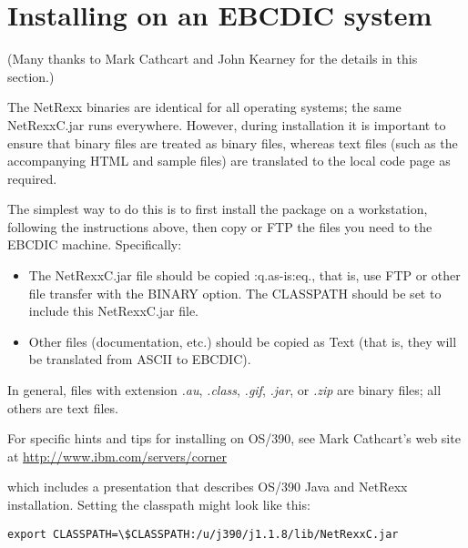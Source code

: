 \chapter{Installing on an EBCDIC system}

(Many thanks to Mark Cathcart and John Kearney for the details in this
section.)

The NetRexx binaries are identical for all operating systems; the same
NetRexxC.jar runs everywhere.
However, during installation it is important to ensure that binary files
are treated as binary files, whereas text files (such as the
accompanying HTML and sample files) are translated to the local code
page as required.

The simplest way to do this is to first install the package on a
workstation, following the instructions above, then copy or FTP the
files you need to the EBCDIC machine.  Specifically:
\begin{itemize}
\item The NetRexxC.jar file should be copied :q.as-is:eq., that is, use
FTP or other file transfer with the BINARY option.  The CLASSPATH should
be set to include this NetRexxC.jar file.
\item Other files (documentation, etc.) should be copied as Text (that is,
they will be translated from ASCII to EBCDIC).
\end{itemize}

In general, files with extension \emph{.au}, \emph{.class}, \emph{.gif}, \emph{.jar},
or \emph{.zip} are binary files; all others are text files.

For specific hints and tips for installing on OS/390, see Mark
Cathcart's web site at \url{http://www.ibm.com/servers/corner}

which includes a presentation that describes OS/390 Java and NetRexx
installation.  Setting the classpath might look like this:
\begin{verbatim}
export CLASSPATH=\$CLASSPATH:/u/j390/j1.1.8/lib/NetRexxC.jar
\end{verbatim}
